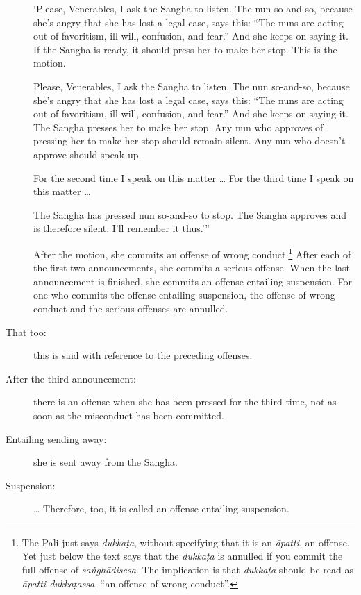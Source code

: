 \documentclass[12pt,openany]{book}%
\begin{document}
\begin{description}
‘Please, Venerables, I ask the Sangha to listen. The nun so-and-so, because she’s angry that she has lost a legal case, says this:  “The nuns are acting out of favoritism, ill will, confusion, and fear.” And she keeps on saying it. If the Sangha is ready, it should press her to make her stop. This is the motion. 

Please, Venerables, I ask the Sangha to listen. The nun so-and-so, because she’s angry that she has lost a legal case, says this: “The nuns are acting out of favoritism, ill will, confusion, and fear.” And she keeps on saying it. The Sangha presses her to make her stop. Any nun who approves of pressing her to make her stop should remain silent. Any nun who doesn’t approve should speak up. 

For the second time I speak on this matter … For the third time I speak on this matter … 

The Sangha has pressed nun so-and-so to stop. The Sangha approves and is therefore silent. I’ll remember it thus.’” 

After the motion, she commits an offense of wrong conduct.\footnote{The Pali just says \textit{\textsanskrit{dukkaṭa}}, without specifying that it is an \textit{\textsanskrit{āpatti}}, an offense. Yet just below the text says that the \textit{\textsanskrit{dukkaṭa}} is annulled if you commit the full offense of \textit{\textsanskrit{saṅghādisesa}}. The implication is that \textit{\textsanskrit{dukkaṭa}} should be read as \textit{\textsanskrit{āpatti} \textsanskrit{dukkaṭassa}}, “an offense of wrong conduct”. } After each of the first two announcements, she commits a serious offense. When the last announcement is finished, she commits an offense entailing suspension. For one who commits the offense entailing suspension, the offense of wrong conduct and the serious offenses are annulled. 

%
\item[That too: ] this is said with reference to the preceding offenses. %
\item[After the third announcement: ] there is an offense when she has been pressed for the third time, not as soon as the misconduct has been committed. %
\item[Entailing sending away: ] she is sent away from the Sangha. %
\item[Suspension: ] … Therefore, too, it is called an offense entailing suspension. %
\end{description}
\end{document}
